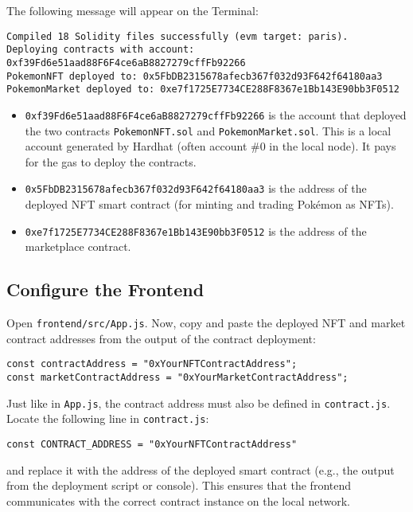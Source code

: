 \documentclass{article}
\begin{document}
The following message will appear on the Terminal:
\begin{lstlisting}
Compiled 18 Solidity files successfully (evm target: paris).
Deploying contracts with account: 0xf39Fd6e51aad88F6F4ce6aB8827279cffFb92266
PokemonNFT deployed to: 0x5FbDB2315678afecb367f032d93F642f64180aa3
PokemonMarket deployed to: 0xe7f1725E7734CE288F8367e1Bb143E90bb3F0512
\end{lstlisting}


\begin{itemize}
    \item \texttt{0xf39Fd6e51aad88F6F4ce6aB8827279cffFb92266} is the account that deployed the two contracts \texttt{PokemonNFT.sol} and \texttt{PokemonMarket.sol}. This is a local account generated by Hardhat (often account \#0 in the local node). It pays for the gas to deploy the contracts.
	\item \texttt{0x5FbDB2315678afecb367f032d93F642f64180aa3} is the address of the deployed NFT smart contract (for minting and trading Pokémon as NFTs).
	\item \texttt{0xe7f1725E7734CE288F8367e1Bb143E90bb3F0512} is the address of the marketplace contract.
\end{itemize}

\subsection{Configure the Frontend}
Open \texttt{frontend/src/App.js}. Now, copy and paste the deployed NFT and market contract addresses from the output of the contract deployment:

\begin{lstlisting}
const contractAddress = "0xYourNFTContractAddress";
const marketContractAddress = "0xYourMarketContractAddress";
\end{lstlisting}

Just like in \texttt{App.js}, the contract address must also be defined in \texttt{contract.js}. Locate the following line in \texttt{contract.js}:

\begin{lstlisting}
const CONTRACT_ADDRESS = "0xYourNFTContractAddress"
\end{lstlisting}

and replace it with the address of the deployed smart contract (e.g., the output from the deployment script or console). This ensures that the frontend communicates with the correct contract instance on the local network.
\end{document}
